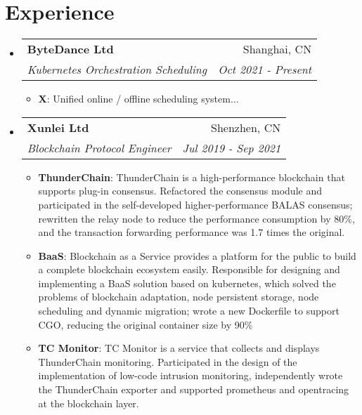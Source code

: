 \documentclass[letterpaper,12pt]{article}
\makeatletter
\newcommand{\resumeItem}[2]{
  \item\small{
    \textbf{#1}{: #2 \vspace{-2pt}}
  }
}
\newcommand{\resumeSubheading}[4]{
  \vspace{-1pt}\item
    \begin{tabular*}{0.97\textwidth}[t]{l@{\extracolsep{\fill}}r}
      \textbf{#1} & #2 \\
      \textit{\small#3} & \textit{\small #4} \\
    \end{tabular*}\vspace{-5pt}
}
\newcommand{\resumeSubHeadingListStart}{\begin{itemize}[leftmargin=*]}
\newcommand{\resumeSubHeadingListEnd}{\end{itemize}}
\newcommand{\resumeItemListStart}{\begin{itemize}}
\newcommand{\resumeItemListEnd}{\end{itemize}\vspace{-5pt}}
\makeatother
\begin{document}
\section{Experience}
  \resumeSubHeadingListStart
    \resumeSubheading
      {ByteDance Ltd}{Shanghai, CN}
      {Kubernetes Orchestration Scheduling}{Oct 2021 - Present}
      \resumeItemListStart
        \resumeItem{X}
          {Unified online / offline scheduling system...}
      \resumeItemListEnd
    \resumeSubheading
      {Xunlei Ltd}{Shenzhen, CN}
      {Blockchain Protocol Engineer}{Jul 2019 - Sep 2021}
      \resumeItemListStart
        \resumeItem{ThunderChain}
          {ThunderChain is a high-performance blockchain that supports plug-in consensus.
          Refactored the consensus module and participated in the self-developed higher-performance
          BALAS consensus; rewritten the relay node to reduce the performance consumption by 80\%,
          and the transaction forwarding performance was 1.7 times the original.}
        \resumeItem{BaaS}
          {Blockchain as a Service provides a platform for the public to build a
          complete blockchain ecosystem easily.
          Responsible for designing and implementing a BaaS solution based on kubernetes, which solved the 
          problems of blockchain adaptation, node persistent storage, node scheduling and dynamic migration; 
          wrote a new Dockerfile to support CGO, reducing the original container size by 90\%}
        \resumeItem{TC Monitor}
          {TC Monitor is a service that collects and displays ThunderChain monitoring. Participated in
          the design of the implementation of low-code intrusion monitoring, independently wrote the
          ThunderChain exporter and supported prometheus and opentracing at the blockchain layer.}
      \resumeItemListEnd
  \resumeSubHeadingListEnd

\end{document}
